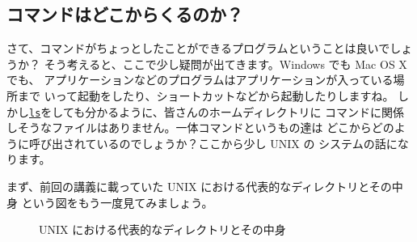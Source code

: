 \documentclass[a4j]{ltjsreport}
\begin{document}
    \subsection{コマンドはどこからくるのか？}
    さて、コマンドがちょっとしたことができるプログラムということは良いでしょうか？
    そう考えると、ここで少し疑問が出てきます。Windows でも Mac OS X でも、
    アプリケーションなどのプログラムはアプリケーションが入っている場所まで
    いって起動をしたり、ショートカットなどから起動したりしますね。
    しかし\underline{\texttt{ls}}をしても分かるように、皆さんのホームディレクトリに
    コマンドに関係しそうなファイルはありません。一体コマンドというもの達は
    どこからどのように呼び出されているのでしょうか？ここから少し UNIX の
    システムの話になります。

    まず、前回の講義に載っていた UNIX における代表的なディレクトリとその中身
    という図をもう一度見てみましょう。
    \begin{figure}[htbp]
        \centering
        \caption{UNIX における代表的なディレクトリとその中身}
        \label{fig:dir}
    \end{figure}
\end{document}
